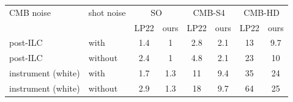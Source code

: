 \begin{tabular}{llcccccc}
\toprule
CMB noise & shot noise & \multicolumn{2}{c}{SO} & \multicolumn{2}{c}{CMB-S4} & \multicolumn{2}{c}{CMB-HD} \\
 & & LP22 & ours & LP22 & ours & LP22 & ours \\
\midrule
post-ILC & with & 1.4 & 1 & 2.8 & 2.1 & 13 & 9.7 \\
post-ILC & without & 2.4 & 1 & 4.8 & 2.1 & 23 & 10 \\
instrument (white) & with & 1.7 & 1.3 & 11 & 9.4 & 35 & 24 \\
instrument (white) & without & 2.9 & 1.3 & 18 & 9.7 & 64 & 25 \\
\bottomrule
\end{tabular}
